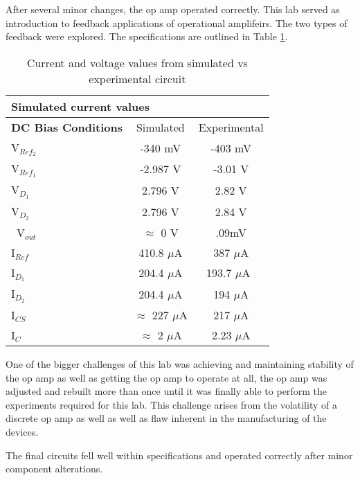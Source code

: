 
After several minor changes, the op amp operated correctly. This lab served as introduction to feedback applications of operational amplifeirs. The two types of feedback were explored. The specifications are outlined in Table \ref{tab:specs}.

\begin{table}[H]
	\centering
	\caption{Current and voltage values from simulated vs experimental circuit}
	\label{tab:specs}
	\begin{tabular}{|l|c|c|}
		\hline
		\multicolumn{3}{|l|}{Simulated current values}                            \\ \hline
		\textbf{DC Bias Conditions} & Simulated & Experimental        \\ \hline
		V$_{Ref_2}$ & -340 mV      & -403 mV                                        \\ \hline
		V$_{Ref_1}$ & -2.987 V       & -3.01 V                        	   \\ \hline
		V$_{D_1}$ & 2.796 V          & 2.82 V                              	       	       \\ \hline
		V$_{D_2}$  & 2.796 V                       & 2.84 V                        	   \\ \hline\
		V$_{out}$ & $\approx$ 0 V				& .09mV 						 \\ \hline
		I$_{Ref}$ & 410.8 $\mu$A            & 387 $\mu$A                                       \\ \hline
		I$_{D_1}$ & 204.4 $\mu$A              &  193.7 $\mu$A\                                    \\ \hline
		I$_{D_2}$ & 204.4 $\mu$A                  & 194 $\mu$A                                \\ \hline
		I$_{CS}$  & $\approx$  227 $\mu$A               & 217 $\mu$A                            \\ \hline
		I$_{C}$   & $\approx$ 2  $\mu$A				& 2.23 $\mu$A 						 \\	\hline

	\end{tabular}
\end{table}


One of the bigger challenges of this lab was achieving and maintaining stability of the op amp as well as getting the op amp to operate at all, the op amp was adjusted and rebuilt more than once until it was finally able to perform the experiments required for this lab. This challenge arises from the volatility of a discrete op amp as well as well as flaw inherent in the manufacturing of the devices.

The final circuits fell well within specifications and operated correctly after minor component alterations.



